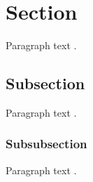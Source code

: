



\section{Section} \label{section}

Paragraph text \citep{lastnamep:yearp}.




\subsection{Subsection} \label{subsection}

Paragraph text \citep{lastnamea:yeara}.




\subsubsection{Subsubsection} \label{subsubsection}

Paragraph text \citep{lastnamee:yeare}.

